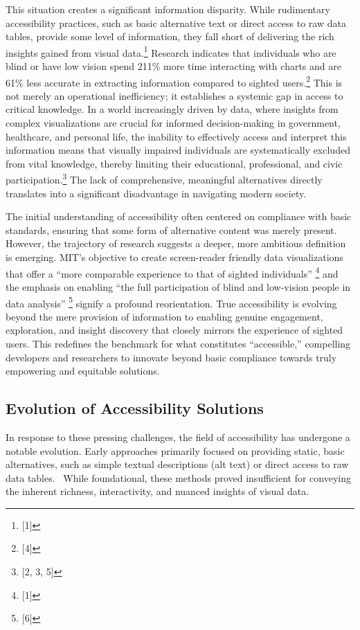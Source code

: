 This situation creates a significant information disparity. While rudimentary accessibility practices, such as basic alternative text or direct access to raw data tables, provide some level of information, they fall short of delivering the rich insights gained from visual data.\footnote{[1]} Research indicates that individuals who are blind or have low vision spend 211\% more time interacting with charts and are 61\% less accurate in extracting information compared to sighted users.\footnote{[4]} This is not merely an operational inefficiency; it establishes a systemic gap in access to critical knowledge. In a world increasingly driven by data, where insights from complex visualizations are crucial for informed decision-making in government, healthcare, and personal life, the inability to effectively access and interpret this information means that visually impaired individuals are systematically excluded from vital knowledge, thereby limiting their educational, professional, and civic participation.\footnote{[2, 3, 5]} The lack of comprehensive, meaningful alternatives directly translates into a significant disadvantage in navigating modern society.

The initial understanding of accessibility often centered on compliance with basic standards, ensuring that some form of alternative content was merely present. However, the trajectory of research suggests a deeper, more ambitious definition is emerging. MIT's objective to create screen-reader friendly data visualizations that offer a ``more comparable experience to that of sighted individuals'' \footnote{[1]} and the emphasis on enabling ``the full participation of blind and low-vision people in data analysis'' \footnote{[6]} signify a profound reorientation. True accessibility is evolving beyond the mere provision of information to enabling genuine engagement, exploration, and insight discovery that closely mirrors the experience of sighted users. This redefines the benchmark for what constitutes ``accessible,'' compelling developers and researchers to innovate beyond basic compliance towards truly empowering and equitable solutions.

\subsection{Evolution of Accessibility Solutions}
In response to these pressing challenges, the field of accessibility has undergone a notable evolution. Early approaches primarily focused on providing static, basic alternatives, such as simple textual descriptions (alt text) or direct access to raw data tables.~ \cite{EvolutionOfAccessibilitySolutions} While foundational, these methods proved insufficient for conveying the inherent richness, interactivity, and nuanced insights of visual data.


